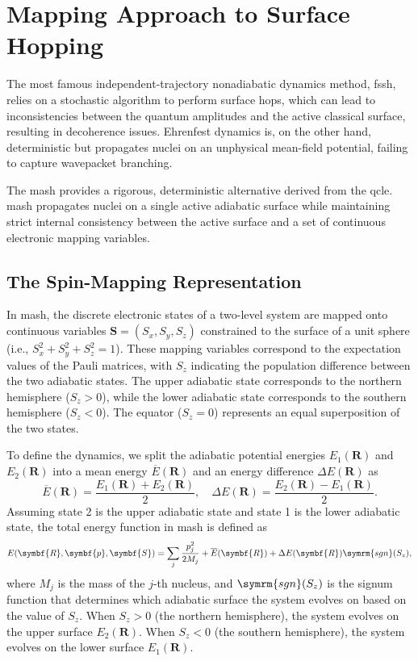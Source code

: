 \section{Mapping Approach to Surface Hopping}\label{sec:mash}
The most famous independent-trajectory nonadiabatic dynamics method, \acrshort{fssh}, relies on a stochastic algorithm to perform surface hops, which can lead to inconsistencies between the quantum amplitudes and the active classical surface, resulting in decoherence issues. Ehrenfest dynamics is, on the other hand, deterministic but propagates nuclei on an unphysical mean-field potential, failing to capture wavepacket branching.

The \acrfull{mash} provides a rigorous, deterministic alternative derived from the \acrfull{qcle}. \acrshort{mash} propagates nuclei on a single active adiabatic surface while maintaining strict internal consistency between the active surface and a set of continuous electronic mapping variables.\supercite{10.1063/5.0139734}
\subsection{The Spin-Mapping Representation}\label{sec:mash_mapping}
In \acrshort{mash}, the discrete electronic states of a two-level system are mapped onto continuous variables $\symbf{S}=(S_x,S_y,S_z)$ constrained to the surface of a unit sphere (i.e., $S_x^2+S_y^2+S_z^2=1$). These mapping variables correspond to the expectation values of the Pauli matrices, with $S_z$ indicating the population difference between the two adiabatic states. The upper adiabatic state corresponds to the northern hemisphere ($S_z>0$), while the lower adiabatic state corresponds to the southern hemisphere ($S_z<0$). The equator ($S_z=0$) represents an equal superposition of the two states.

To define the dynamics, we split the adiabatic potential energies $E_1(\symbf{R})$ and $E_2(\symbf{R})$ into a mean energy $\overline{E}(\symbf{R})$ and an energy difference $\Delta E(\symbf{R})$ as
\begin{equation}
\overline{E}(\symbf{R})=\frac{E_1(\symbf{R})+E_2(\symbf{R})}{2},\quad\Delta E(\symbf{R})=\frac{E_2(\symbf{R})-E_1(\symbf{R})}{2}.
\end{equation}
Assuming state 2 is the upper adiabatic state and state 1 is the lower adiabatic state, the total energy function in \acrshort{mash} is defined as
\begin{equation}\label{eq:mash_energy}
E(\symbf{R},\symbf{p},\symbf{S})=\sum_{j}\frac{p_j^2}{2M_j}+\overline{E}(\symbf{R})+\Delta E(\symbf{R})\symrm{sgn}(S_z),
\end{equation}
where $M_j$ is the mass of the $j$-th nucleus, and $\symrm{sgn}(S_z)$ is the signum function that determines which adiabatic surface the system evolves on based on the value of $S_z$. When $S_z>0$ (the northern hemisphere), the system evolves on the upper surface $E_2(\symbf{R})$. When $S_z<0$ (the southern hemisphere), the system evolves on the lower surface $E_1(\symbf{R})$.

